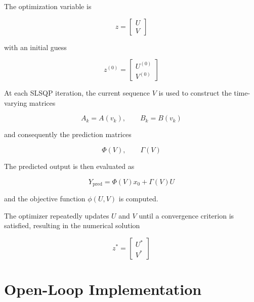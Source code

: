 The optimization variable is

\begin{equation}
    z =
    \begin{bmatrix}
        U \\
        V
    \end{bmatrix}
\end{equation}

with an initial guess

\begin{equation}
    z^{(0)}
    =
    \begin{bmatrix}
        U^{(0)} \\
        V^{(0)}
    \end{bmatrix}
\end{equation}

At each SLSQP iteration, the current sequence \(V\) is used to construct the time-varying matrices

\begin{equation}
    A_k=A(v_k),
    \qquad
    B_k=B(v_k)
\end{equation}

and consequently the prediction matrices

\begin{equation}
    \Phi(V),
    \qquad
    \Gamma(V)
\end{equation}

The predicted output is then evaluated as

\begin{equation}
    Y_{\mathrm{pred}}
    =
    \Phi(V)x_0
    +
    \Gamma(V)U
\end{equation}

and the objective function \(\phi(U,V)\) is computed.

The optimizer repeatedly updates \(U\) and \(V\) until a convergence criterion is satisfied, resulting in the numerical solution

\begin{equation}
    z^\ast
    =
    \begin{bmatrix}
        U^\ast \\
        V^\ast
    \end{bmatrix}
\end{equation}

\section{Open-Loop Implementation}
\label{sec:bilinear_open_loop}

